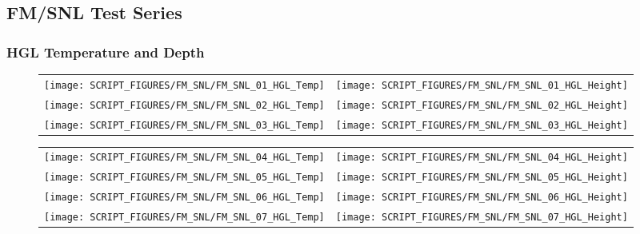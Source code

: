 \clearpage

\subsection{FM/SNL Test Series}

\subsubsection{HGL Temperature and Depth}

\begin{figure}[!ht]
\begin{tabular*}{\textwidth}{l@{\extracolsep{\fill}}r}
\texttt{[image: SCRIPT\_FIGURES/FM\_SNL/FM\_SNL\_01\_HGL\_Temp]} &
\texttt{[image: SCRIPT\_FIGURES/FM\_SNL/FM\_SNL\_01\_HGL\_Height]} \\
\texttt{[image: SCRIPT\_FIGURES/FM\_SNL/FM\_SNL\_02\_HGL\_Temp]} &
\texttt{[image: SCRIPT\_FIGURES/FM\_SNL/FM\_SNL\_02\_HGL\_Height]} \\
\texttt{[image: SCRIPT\_FIGURES/FM\_SNL/FM\_SNL\_03\_HGL\_Temp]} &
\texttt{[image: SCRIPT\_FIGURES/FM\_SNL/FM\_SNL\_03\_HGL\_Height]}
\end{tabular*}
\end{figure}

\newpage

\begin{figure}[!ht]
\begin{tabular*}{\textwidth}{l@{\extracolsep{\fill}}r}
\texttt{[image: SCRIPT\_FIGURES/FM\_SNL/FM\_SNL\_04\_HGL\_Temp]} &
\texttt{[image: SCRIPT\_FIGURES/FM\_SNL/FM\_SNL\_04\_HGL\_Height]} \\
\texttt{[image: SCRIPT\_FIGURES/FM\_SNL/FM\_SNL\_05\_HGL\_Temp]} &
\texttt{[image: SCRIPT\_FIGURES/FM\_SNL/FM\_SNL\_05\_HGL\_Height]} \\
\texttt{[image: SCRIPT\_FIGURES/FM\_SNL/FM\_SNL\_06\_HGL\_Temp]} &
\texttt{[image: SCRIPT\_FIGURES/FM\_SNL/FM\_SNL\_06\_HGL\_Height]} \\
\texttt{[image: SCRIPT\_FIGURES/FM\_SNL/FM\_SNL\_07\_HGL\_Temp]} &
\texttt{[image: SCRIPT\_FIGURES/FM\_SNL/FM\_SNL\_07\_HGL\_Height]}
\end{tabular*}
\end{figure}

